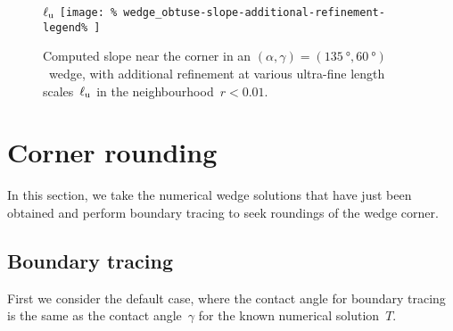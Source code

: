 \begin{figure}
  \newcommand*{\subfigurewidth}{0.45\textwidth}
  \centering
  $\ell_{\mathrm{u}}$
  \texttt{[image: \%
    wedge\_obtuse-slope-additional-refinement-legend\%
  ]}
  \hspace*{\fill}
  \begin{subfigure}[t]{\subfigurewidth}
  \end{subfigure}
    \hfill
  \begin{subfigure}[t]{\subfigurewidth}
  \end{subfigure}
  \hspace*{\fill}
  \caption{
    Computed slope near the corner
    in an $(\alpha, \gamma) = (\SI{135}{\degree}, \SI{60}{\degree})$~wedge,
    with additional refinement
    at various ultra-fine length scales~$\ell_{\mathrm{u}}$
    in the neighbourhood~$r < 0.01$.
  }
  \label{fig:wedge_obtuse-slope-additional-refinement}
\end{figure}

\section{Corner rounding}
\label{sec:re-entrant.rounding}

In this section,
we take the numerical wedge solutions that have just been obtained
and perform boundary tracing
to seek roundings of the wedge corner.

\subsection{Boundary tracing}
\label{sec:re-entrant.rounding.tracing}

First we consider the default case,
where the contact angle for boundary tracing
is the same as the contact angle~$\gamma$
for the known numerical solution~$T$.

